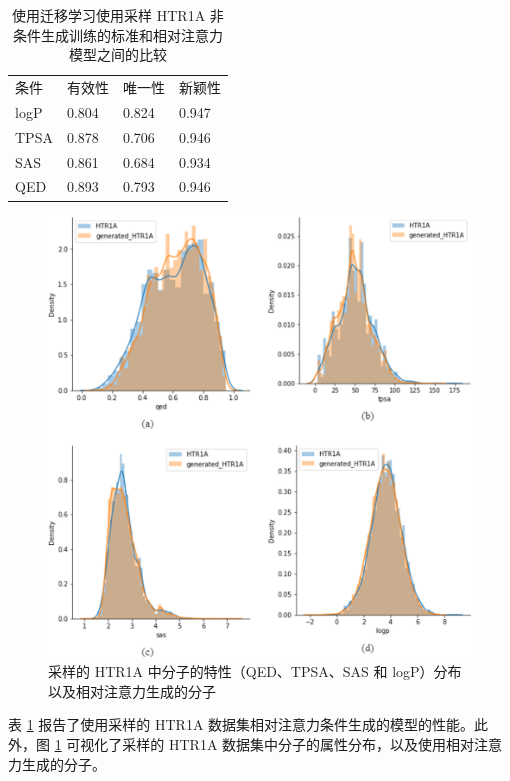 \begin{translation}
\begin{table}[H]
  \centering
  \caption{使用迁移学习使用采样 HTR1A 非条件生成训练的标准和相对注意力模型之间的比较}
  \label{tab:12}
  \begin{tabular}{llll}
    \hline 条件 & 有效性   & 唯一性   & 新颖性   \\
    logP      & 0.804 & 0.824 & 0.947 \\
    TPSA      & 0.878 & 0.706 & 0.946 \\
    SAS       & 0.861 & 0.684 & 0.934 \\
    QED       & 0.893 & 0.793 & 0.946 \\
    \hline
  \end{tabular}
\end{table}

\begin{figure}[H]
  \centering
  \includegraphics[width=\linewidth]{figures/8.png}
  \caption{采样的 HTR1A 中分子的特性（QED、TPSA、SAS 和 logP）分布以及相对注意力生成的分子}
  \label{fig:8}
\end{figure}

表 \ref{tab:12} 报告了使用采样的 HTR1A 数据集相对注意力条件生成的模型的性能。此外，图 \ref{fig:8} 可视化了采样的 HTR1A 数据集中分子的属性分布，以及使用相对注意力生成的分子。



\end{translation}
